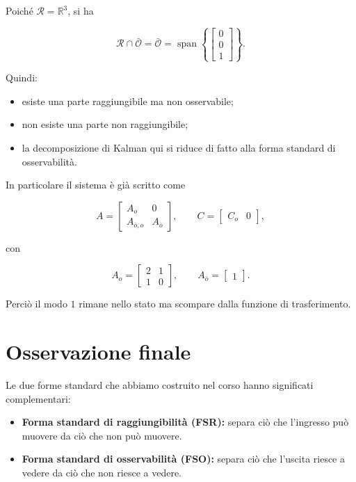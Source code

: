Poiché \(\mathcal R=\mathbb R^3\), si ha

\[
\mathcal R\cap\bar{\mathcal O}
=
\bar{\mathcal O}
=
\operatorname{span}\left\{
\begin{bmatrix}
0\\0\\1
\end{bmatrix}
\right\}.
\]

Quindi:
\begin{itemize}
    \item esiste una parte raggiungibile ma non osservabile;
    \item non esiste una parte non raggiungibile;
    \item la decomposizione di Kalman qui si riduce di fatto alla forma standard di osservabilità.
\end{itemize}

In particolare il sistema è già scritto come

\[
A=
\left[
\begin{array}{c|c}
A_o & 0\\
\hline
A_{\bar o,o} & A_{\bar o}
\end{array}
\right],
\qquad
C=
\begin{bmatrix}
C_o & 0
\end{bmatrix},
\]

con

\[
A_o=
\begin{bmatrix}
2 & 1\\
1 & 0
\end{bmatrix},
\qquad
A_{\bar o}=
\begin{bmatrix}
1
\end{bmatrix}.
\]

Perciò il modo \(1\) rimane nello stato ma scompare dalla funzione di trasferimento.

\bigskip

\section{Osservazione finale}

Le due forme standard che abbiamo costruito nel corso hanno significati complementari:

\begin{itemize}
    \item \textbf{Forma standard di raggiungibilità (FSR):} separa ciò che l'ingresso può muovere da ciò che non può muovere.
    \item \textbf{Forma standard di osservabilità (FSO):} separa ciò che l'uscita riesce a vedere da ciò che non riesce a vedere.
\end{itemize}

